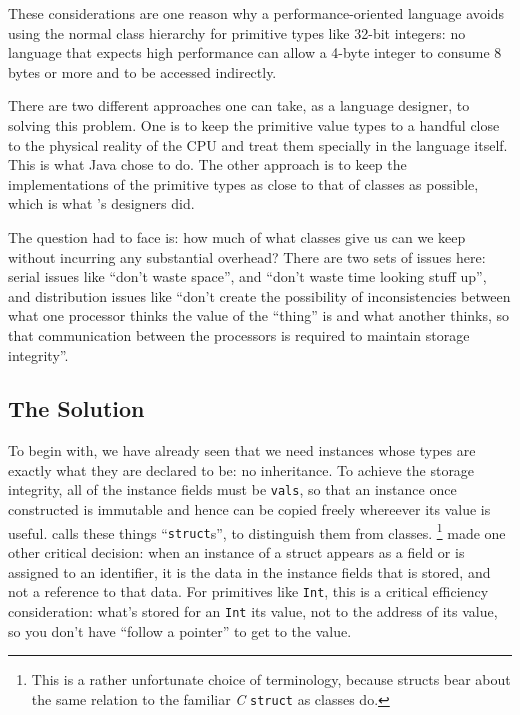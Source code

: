 These considerations are one reason why a performance-oriented language avoids
using the normal class hierarchy for primitive types like 32-bit integers: no language
that expects high performance can allow a 4-byte integer to consume 8 bytes or
more and to be accessed indirectly.  

There are two different approaches one can
take, as a language designer, to solving this problem.  One is to keep the
primitive value types to a handful close to the physical reality of the CPU
and treat them specially in the language itself.  This is what Java chose to do.
The other approach is to keep the implementations of the primitive
types as close to that of classes as possible, which is what \Xten's designers
did.

The question \Xten{} had to face is: how much of what classes give
us can we keep without incurring any substantial overhead? 
There are two sets of  issues here: serial issues like ``don't waste space'',
and ``don't waste time looking stuff up'', and distribution issues like ``don't
create the possibility of inconsistencies between what one processor thinks the
value of the ``thing'' is and what another thinks, so that communication
between the processors is required to maintain storage integrity''.

\subsection{The Solution}\label{sec:ecs}
To begin with, we have already seen that we need instances whose types are
exactly what they are declared to be: no inheritance.  To achieve the storage
integrity, all of the instance fields must be {\tt vals}, so that an
instance once constructed is immutable and hence can be copied freely
whereever its value is useful.  
\Xten{} calls these things ``{\tt struct}s'', to distinguish them from
classes.
\footnote{
This is a rather unfortunate choice of terminology, because \Xten{} structs  bear about the same
relation to the familiar {\em C} {\tt struct} as \Xten{} classes do.
}  
\Xten{} made one other critical decision: when an instance of a
struct appears as a field or is assigned to an identifier, it is the
data in the instance fields that is stored, and not a reference to that data.
For primitives like {\tt Int}, this is a critical efficiency consideration:
what's stored for an {\tt Int} its value, not to the address of its value, so
you don't have ``follow a pointer'' to get to the value.


